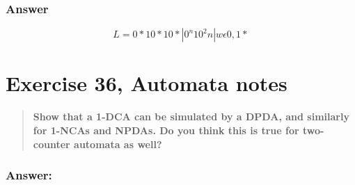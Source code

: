 \documentclass[titlepage]{article}\usepackage[]{graphicx}\usepackage[]{color}
\begin{document}
\subsubsection{Answer}

\[ L = {{0*}1{0*}1{0*} | 0^n 1 0^2n | w \epsilon {0,1}* } \]



\section{Exercise 36, Automata notes}
\begin{quote}
  \textbf{Show that a 1-DCA can be simulated by a DPDA, and similarly for
  1-NCAs and NPDAs. Do you think this is true for two-counter automata as well?}
\end{quote}
\subsubsection{Answer:}
\vspace{5cm}
\end{document}
